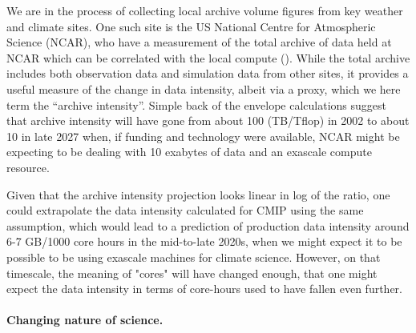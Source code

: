We are in the process of collecting local archive volume figures from key
weather and climate sites. One such site  is the US National Centre for Atmospheric Science (NCAR), who have a measurement of the total archive of data held at NCAR which can be correlated with the local compute ().  While the total archive includes both observation data and simulation data from other sites, it provides a useful measure of the change in data intensity, albeit via a proxy, which we here term the ``archive intensity''.  Simple back of the envelope calculations suggest that archive intensity will have gone from about 100 (TB/Tflop) in 2002 to about 10 in late 2027 when, if funding and technology were available, NCAR might be expecting to be dealing with 10 exabytes of data and an exascale compute resource.

Given that the archive intensity projection looks linear in log of the ratio, one could extrapolate the data intensity calculated for CMIP using the same assumption, which would lead to a prediction of production data intensity around 6-7 GB/1000 core hours in the mid-to-late 2020s, when we might expect it to be possible to be using exascale machines for climate science. However, on that timescale, the meaning of "cores" will have changed enough, that one might expect the data intensity in terms of core-hours used to have fallen even further.

\paragraph{Changing nature of science.}

